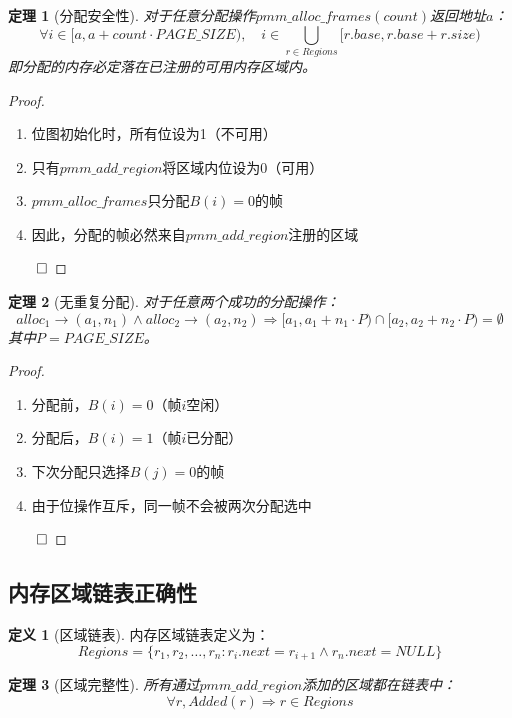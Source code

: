 \documentclass{article}
\newtheorem{theorem}{定理}[section]
\theoremstyle{definition}
\newtheorem{definition}{定义}[section]
\theoremstyle{remark}
\begin{document}
\begin{theorem}[分配安全性]
    对于任意分配操作$pmm\_alloc\_frames(count)$返回地址$a$：
    \[
    \forall i \in [a, a + count \cdot PAGE\_SIZE), \quad i \in \bigcup_{r \in Regions} [r.base, r.base + r.size)
    \]
    即分配的内存必定落在已注册的可用内存区域内。
\end{theorem}

\begin{proof}
    \begin{enumerate}
        \item 位图初始化时，所有位设为1（不可用）
        \item 只有$pmm\_add\_region$将区域内位设为0（可用）
        \item $pmm\_alloc\_frames$只分配$B(i) = 0$的帧
        \item 因此，分配的帧必然来自$pmm\_add\_region$注册的区域
    \end{enumerate}
    $\qed$
\end{proof}

\begin{theorem}[无重复分配]
    对于任意两个成功的分配操作：
    \[
    alloc_1 \to (a_1, n_1) \land alloc_2 \to (a_2, n_2) \Rightarrow [a_1, a_1 + n_1 \cdot P) \cap [a_2, a_2 + n_2 \cdot P) = \emptyset
    \]
    其中$P = PAGE\_SIZE$。
\end{theorem}

\begin{proof}
    \begin{enumerate}
        \item 分配前，$B(i) = 0$（帧$i$空闲）
        \item 分配后，$B(i) = 1$（帧$i$已分配）
        \item 下次分配只选择$B(j) = 0$的帧
        \item 由于位操作互斥，同一帧不会被两次分配选中
    \end{enumerate}
    $\qed$
\end{proof}

\subsection{内存区域链表正确性}

\begin{definition}[区域链表]
    内存区域链表定义为：
    \[
    Regions = \{r_1, r_2, \ldots, r_n : r_i.next = r_{i+1} \land r_n.next = NULL\}
    \]
\end{definition}

\begin{theorem}[区域完整性]
    所有通过$pmm\_add\_region$添加的区域都在链表中：
    \[
    \forall r, Added(r) \Rightarrow r \in Regions
    \]
\end{theorem}
\end{document}
